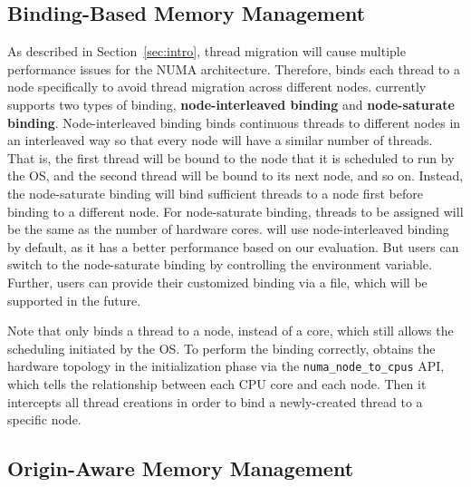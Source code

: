 \subsection{Binding-Based Memory Management} 
\label{sec:balance}
As described in Section~\ref{sec:intro}, thread migration will cause multiple performance issues for the NUMA architecture. Therefore, \NM{} binds each thread to a node specifically to avoid thread migration across different nodes.  \NM{} currently supports two types of binding, \textbf{node-interleaved binding} and \textbf{node-saturate binding}. Node-interleaved binding binds continuous threads to different nodes in an interleaved way so that every node will have a similar number of threads. That is, the first thread will be bound to the node that it is scheduled to run by the OS, and the second thread will be bound to its next node, and so on. Instead, the node-saturate binding will bind sufficient threads to a node first before binding to a different node. For node-saturate binding, threads to be assigned will be the same as the number of hardware cores.  \NM{} will use node-interleaved binding by default, as it has a better performance based on our evaluation. But users can switch to the node-saturate binding by controlling the environment variable. Further, users can provide their customized binding via a file, which will be supported in the future. 

Note that \NM{} only binds a thread to a node, instead of a core, which still allows the scheduling initiated by the OS. To perform the binding correctly, \NM{} obtains the hardware topology in the initialization phase via the \texttt{numa\_node\_to\_cpus} API, which tells the relationship between each CPU core and each 
node. Then it intercepts all thread creations in order to bind a newly-created thread to a specific node.

\subsection{Origin-Aware Memory Management} 
\label{sec:origin}


